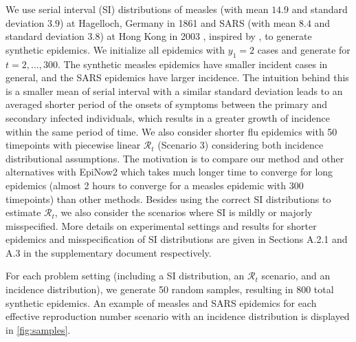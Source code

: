 \documentclass[10pt,letterpaper]{article}
\def\calR{\mathcal{R}}
\newcommand{\citep}[1]{\cite{#1}}
\begin{document}
We use serial interval (SI) distributions of measles (with mean $14.9$ and standard 
deviation $3.9$) at Hagelloch, Germany in 1861 \citep{groendyke2011bayesian} and 
SARS (with mean $8.4$ and standard deviation $3.8$) at Hong Kong in 2003 
\citep{lipsitch2003transmission}, inspired by \cite{cori2013new}, to generate synthetic 
epidemics. We initialize all epidemics with $y_1=2$ cases and generate for $t=2,\ldots,300$. 
The synthetic measles epidemics have smaller incident cases in general, and the SARS 
epidemics have larger incidence. The intuition behind this is a smaller mean
of serial interval with a similar standard deviation leads to an averaged shorter period 
of the onsets of symptoms between the primary and secondary infected individuals, which 
results in a greater growth of incidence within the same period of time. 
We also consider shorter flu epidemics with 50 timepoints with piecewise linear $\calR_t$ (Scenario 3)
considering both incidence distributional assumptions. The motivation is to compare our method and 
other alternatives with EpiNow2 which takes much longer time to converge 
for long epidemics (almost 2 hours to converge for a measles epidemic 
with 300 timepoints) than other methods.  
Besides using the correct SI distributions to estimate $\calR_t$, we also consider 
the scenarios where SI is mildly or majorly misspecified. 
More details on experimental settings and results for shorter epidemics and misspecification 
of SI distributions are given in Sections A.2.1 and A.3 in the supplementary document respectively. 

For each problem setting (including a SI distribution, an $\calR_t$ scenario, 
and an incidence distribution), we generate 50 random samples, resulting in 
$800$ total synthetic epidemics. 
An example of measles and SARS epidemics for each effective reproduction number scenario
with an incidence distribution is displayed in \autoref{fig:samples}. 
\end{document}
